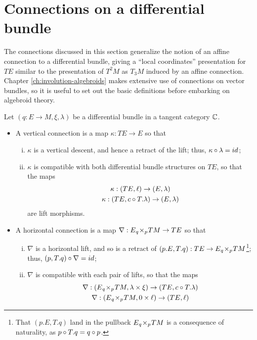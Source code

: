 \section{Connections on a differential bundle}%
\label{sec:connections-on-a-differential-bundle}

The connections discussed in this section generalize the notion of an affine connection to a differential bundle, giving a ``local coordinates'' presentation for $TE$ similar to the presentation of $T^2M$ as $T_3M$ induced by an affine connection. Chapter \ref{ch:involution-algebroids} makes extensive use of connections on vector bundles, so it is useful to set out the basic definitions before embarking on algebroid theory.  
\begin{definition}%
\label{def:lin-connection}
  Let $(q:E \to M, \xi, \lambda)$ be a differential bundle in a tangent category $\mathbb{C}$. 
  \begin{itemize}
    \item A vertical connection is a map $\kappa:TE \to E$ so that 
    \begin{enumerate}[(i)]      
      \item $\kappa$ is a vertical descent, and hence a retract of the lift; thus, $\kappa \circ \lambda = id$;
      \item $\kappa$ is compatible with both differential bundle structures on $TE$, so that the maps
      \begin{gather*}
        \kappa: (TE,\ell) \to (E,\lambda) \\ \kappa:(TE, c\circ T.\lambda) \to (E,\lambda)
      \end{gather*}
      are lift morphisms.
    \end{enumerate}
    \item A horizontal connection is a map $\nabla: E {_{q}}\!\times_{p}\! TM \to TE$ so that
    \begin{enumerate}[(i)]
      \item $\nabla$ is a horizontal lift, and so is a retract of $(p.E, T.q):TE \to E {_{q}}\!\times_{p}\! TM$\footnote{
        That $(p.E,T.q)$ land in the pullback $E {_{q}}\!\times_{p}\! TM$ is a consequence of naturality, as $p \circ T.q = q \circ p$.
      }; thus, $(p, T.q)\circ \nabla = id$;
      \item $\nabla$ is compatible with each pair of lifts, so that the maps
      \begin{gather*}
        \nabla: ( E \ts{q}{p} TM, \lambda \x \xi) \to (TE, c \o T.\lambda) \\
        \nabla: ( E \ts{q}{p} TM, 0 \x \ell) \to (TE, \ell)

\end{gather*}
\end{enumerate}
\end{itemize}
\end{definition}
